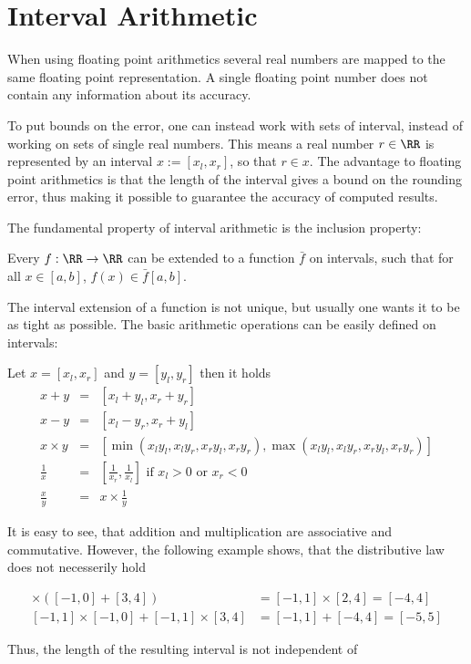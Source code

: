 \section{Interval Arithmetic}
	When using floating point arithmetics several real numbers are mapped to the same floating point representation.
	A single floating point number does not contain any information about its accuracy.

	To put bounds on the error, one can instead work with sets of interval, instead of working on sets of single real numbers.
	This means a real number $r \in \RR$ is represented by an interval $x := [x_l,x_r]$, so that $r \in x$.
	The advantage to floating point arithmetics is that the length of the interval gives a bound on the rounding error, 
	thus making it possible to guarantee the accuracy of computed results.

	The fundamental property of interval arithmetic is the inclusion property:

	Every $f: \RR \to \RR$ can be extended to a function $\bar f$ on intervals, such that for all $x \in [a,b]$, $f(x) \in \bar f[a,b]$. 

	The interval extension of a function is not unique, but usually one wants it to be as tight as possible.
	The basic arithmetic operations can be easily defined on intervals:
	\begin{theorem}
		Let $x = [x_l, x_r]$ and $y = [y_l, y_r]$ then it holds
		\begin{eqnarray}
			x + y  & = & [x_l + y_l, x_r + y_r] \\
			x - y  & = & [x_l - y_r, x_r + y_l] \\
			x \times y  & = & [\min(x_ly_l, x_ly_r, x_ry_l, x_ry_r), \max(x_ly_l, x_ly_r, x_ry_l, x_ry_r)] \\
			\frac{1}{x} & = & \left[\frac{1}{x_r}, \frac{1}{x_l} \right] \text{ if } x_l > 0 \text{ or } x_r < 0 \\
			\frac{x}{y} & = & x \times \frac{1}{y}   
		\end{eqnarray}
	\end{theorem}
	It is easy to see, that addition and multiplication are associative and commutative.
	However, the following example shows, that the distributive law does not necesserily hold
	\begin{example}
		\begin{align*}
			[-1,1] \times ([-1,0] + [3,4])  &= [-1,1] \times [2,4] = [-4,4] \\
			[-1,1] \times [-1,0] + [-1,1] \times [3,4] &=  [-1,1] + [-4,4] =[-5,5] 
		\end{align*}
	\end{example} 
	Thus, the length of the resulting interval is not independent of 
	
